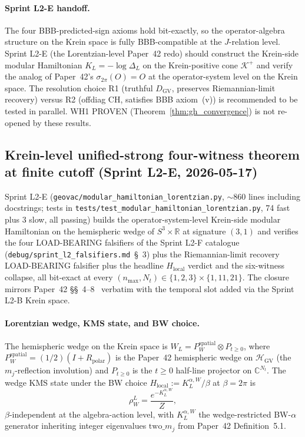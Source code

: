 \documentclass[11pt]{article}
\begin{document}
\paragraph{Sprint L2-E handoff.}
The four BBB-predicted-sign axioms hold bit-exactly, so the
operator-algebra structure on the Krein space is fully BBB-compatible
at the $J$-relation level.  Sprint L2-E (the Lorentzian-level Paper~42
redo) should construct the Krein-side modular Hamiltonian
$K_L = -\log \Delta_L$ on the Krein-positive cone $\mathcal{K}^+$ and
verify the analog of Paper~42's $\sigma_{2\pi}(O) = O$ at the
operator-system level on the Krein space.  The resolution choice
R1 (truthful $D_{\mathrm{GV}}$, preserves Riemannian-limit recovery)
versus R2 (offdiag CH, satisfies BBB axiom~(v)) is recommended to be
tested in parallel.  WH1 PROVEN
(Theorem~\ref{thm:gh_convergence}) is not re-opened by these results.

\subsection{Krein-level unified-strong four-witness theorem at finite
cutoff (Sprint L2-E, 2026-05-17)}
\label{sec:l2e_krein_modular_hamiltonian}

Sprint L2-E (\verb|geovac/modular_hamiltonian_lorentzian.py|, $\sim860$
lines including docstrings; tests in
\verb|tests/test_modular_hamiltonian_lorentzian.py|, 74 fast plus 3
slow, all passing) builds the operator-system-level Krein-side modular
Hamiltonian on the hemispheric wedge of $S^3 \times \mathbb{R}$ at
signature $(3, 1)$ and verifies the four LOAD-BEARING falsifiers of
the Sprint L2-F catalogue
(\texttt{debug/sprint\_l2\_falsifiers.md}~\S~3) plus the
Riemannian-limit recovery LOAD-BEARING falsifier plus the headline
$H_{\mathrm{local}}$ verdict and the six-witness collapse, all bit-exact
at every $(n_{\max}, N_t) \in \{1, 2, 3\} \times \{1, 11, 21\}$.
The closure mirrors Paper~42 \S\S~4--8~\cite{paper42} verbatim with
the temporal slot added via the Sprint L2-B Krein space.

\paragraph{Lorentzian wedge, KMS state, and BW choice.}
The hemispheric wedge on the Krein space is
$W_L = P_W^{\mathrm{spatial}} \otimes P_{t \geq 0}$, where
$P_W^{\mathrm{spatial}} = (1/2)(I + R_{\mathrm{polar}})$ is the
Paper~42 hemispheric wedge on $\mathcal{H}_{\mathrm{GV}}$ (the
$m_j$-reflection involution) and $P_{t \geq 0}$ is the
$t \geq 0$ half-line projector on $\mathbb{C}^{N_t}$.  The wedge KMS
state under the BW choice $H_{\mathrm{local}} := K_L^{\alpha, W}/\beta$
at $\beta = 2\pi$ is
\[
\rho_W^L = \frac{e^{-K_L^{\alpha, W}}}{Z},
\]
$\beta$-independent at the algebra-action level, with $K_L^{\alpha, W}$
the wedge-restricted BW-$\alpha$ generator inheriting integer
eigenvalues $\mathrm{two}\_m_j$ from Paper~42 Definition~5.1.
\end{document}
